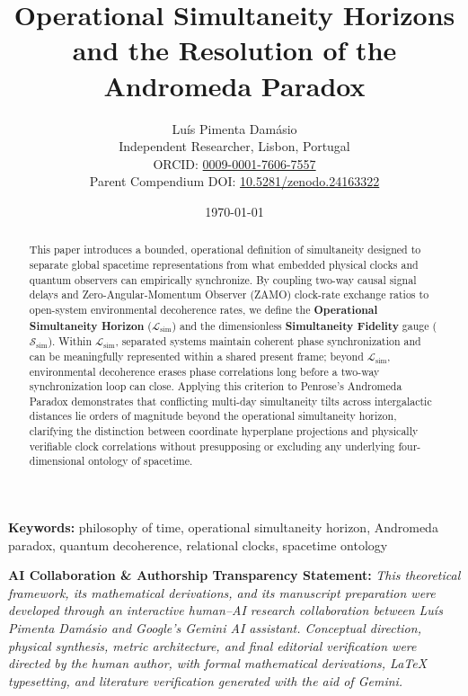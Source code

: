 \documentclass[11pt,a4paper]{article}
\title{\textbf{Operational Simultaneity Horizons and the Resolution of the Andromeda Paradox}}
\author{
    Luís {Pimenta Damásio}\\
    \small Independent Researcher, Lisbon, Portugal\\
    \small ORCID: \href{https://orcid.org/0009-0001-7606-7557}{0009-0001-7606-7557}\\
    \small Parent Compendium DOI: \href{https://doi.org/10.5281/zenodo.24163322}{10.5281/zenodo.24163322}
}
\date{\today}
\begin{document}
\maketitle

\begin{abstract}
This paper introduces a bounded, operational definition of simultaneity designed to separate global spacetime representations from what embedded physical clocks and quantum observers can empirically synchronize. By coupling two-way causal signal delays and Zero-Angular-Momentum Observer (ZAMO) clock-rate exchange ratios to open-system environmental decoherence rates, we define the \textbf{Operational Simultaneity Horizon} ($\mathcal{L}_{\mathrm{sim}}$) and the dimensionless \textbf{Simultaneity Fidelity} gauge ($\mathcal{S}_{\mathrm{sim}}$). Within $\mathcal{L}_{\mathrm{sim}}$, separated systems maintain coherent phase synchronization and can be meaningfully represented within a shared present frame; beyond $\mathcal{L}_{\mathrm{sim}}$, environmental decoherence erases phase correlations long before a two-way synchronization loop can close. Applying this criterion to Penrose's Andromeda Paradox demonstrates that conflicting multi-day simultaneity tilts across intergalactic distances lie orders of magnitude beyond the operational simultaneity horizon, clarifying the distinction between coordinate hyperplane projections and physically verifiable clock correlations without presupposing or excluding any underlying four-dimensional ontology of spacetime.
\end{abstract}

\noindent\textbf{Keywords:} philosophy of time, operational simultaneity horizon, Andromeda paradox, quantum decoherence, relational clocks, spacetime ontology

\vspace{0.5em}
\begin{framed}
\noindent\textbf{AI Collaboration \& Authorship Transparency Statement:} \emph{This theoretical framework, its mathematical derivations, and its manuscript preparation were developed through an interactive human--AI research collaboration between Luís Pimenta Damásio and Google's Gemini AI assistant. Conceptual direction, physical synthesis, metric architecture, and final editorial verification were directed by the human author, with formal mathematical derivations, LaTeX typesetting, and literature verification generated with the aid of Gemini.}
\end{framed}
\end{document}
